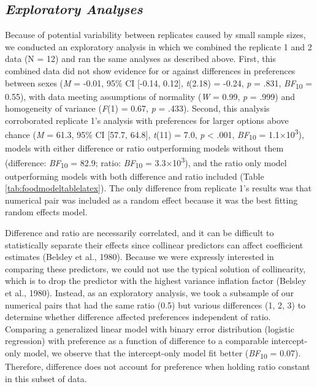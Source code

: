 \documentclass[
  ,pub,floatsintext]{apa6}
\begin{document}
\hypertarget{exploratory-analyses}{%
\subsection{\texorpdfstring{\emph{Exploratory Analyses}}{Exploratory Analyses}}\label{exploratory-analyses}}

Because of potential variability between replicates caused by small sample sizes, we conducted an exploratory analysis in which we combined the replicate 1 and 2 data (N = 12) and ran the same analyses as described above. First, this combined data did not show evidence for or against differences in preferences between sexes (\emph{M} = -0.01, 95\% CI {[}-0.14, 0.12{]}, \emph{t}(2.18) = -0.24, \emph{p} = .831, \emph{BF}\textsubscript{10} = 0.55), with data meeting assumptions of normality (\emph{W} = 0.99, \emph{p} = .999) and homogeneity of variance (\emph{F}(1) = 0.67, \emph{p} = .433). Second, this analysis corroborated replicate 1's analysis with preferences for larger options above chance (\emph{M} = 61.3, 95\% CI {[}57.7, 64.8{]}, \emph{t}(11) = 7.0, \emph{p} \textless{} .001, \emph{BF}\textsubscript{10} = 1.1×10\textsuperscript{3}), models with either difference or ratio outperforming models without them (difference: \emph{BF}\textsubscript{10} = 82.9; ratio: \emph{BF}\textsubscript{10} = 3.3×10\textsuperscript{3}), and the ratio only model outperforming models with both difference and ratio included (Table \ref{tab:foodmodeltablelatex}). The only difference from replicate 1's results was that numerical pair was included as a random effect because it was the best fitting random effects model.

Difference and ratio are necessarily correlated, and it can be difficult to statistically separate their effects since collinear predictors can affect coefficient estimates (Belsley et al., 1980). Because we were expressly interested in comparing these predictors, we could not use the typical solution of collinearity, which is to drop the predictor with the highest variance inflation factor (Belsley et al., 1980). Instead, as an exploratory analysis, we took a subsample of our numerical pairs that had the same ratio (0.5) but various differences (1, 2, 3) to determine whether difference affected preferences independent of ratio. Comparing a generalized linear model with binary error distribution (logistic regression) with preference as a function of difference to a comparable intercept-only model, we observe that the intercept-only model fit better (\emph{BF}\textsubscript{10} = 0.07). Therefore, difference does not account for preference when holding ratio constant in this subset of data.
\end{document}

